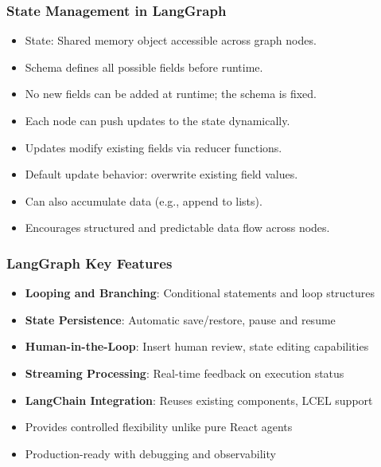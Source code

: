 \begin{frame}[fragile]\frametitle{State Management in LangGraph}
      \begin{itemize}
        \item State: Shared memory object accessible across graph nodes.
        \item Schema defines all possible fields before runtime.
        \item No new fields can be added at runtime; the schema is fixed.
        \item Each node can push updates to the state dynamically.
        \item Updates modify existing fields via reducer functions.
        \item Default update behavior: overwrite existing field values.
        \item Can also accumulate data (e.g., append to lists).
        \item Encourages structured and predictable data flow across nodes.
      \end{itemize}
\end{frame}
\begin{frame}[fragile]\frametitle{LangGraph Key Features}
      \begin{itemize}
        \item \textbf{Looping and Branching}: Conditional statements and loop structures
        \item \textbf{State Persistence}: Automatic save/restore, pause and resume
        \item \textbf{Human-in-the-Loop}: Insert human review, state editing capabilities
        \item \textbf{Streaming Processing}: Real-time feedback on execution status
        \item \textbf{LangChain Integration}: Reuses existing components, LCEL support
        \item Provides controlled flexibility unlike pure React agents
        \item Production-ready with debugging and observability
      \end{itemize}
\end{frame}
